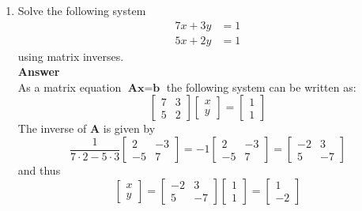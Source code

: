\documentclass[11pt]{article}
\newcommand{\tb}{\textbf}
\theoremstyle{definition}
\begin{document}
\begin{enumerate}
\begin{enumerate}
		\item Prove that
		\begin{equation*}
			\tb{A}^\ast \tb{A}
		\end{equation*}
		is self-adjoint
            \\
            \textbf{Answer}
            \\
            \begin{align*}
            (\tb{A}^\ast \tb{A})^\ast =\tb{A}^\ast(\tb{A}^\ast)^\ast =\tb{A}^\ast\tb{A}
            \end{align*}

	\end{enumerate}
	
	\item Solve the following system
	\begin{align*}
		7 x + 3y & = 1 \\
		5 x + 2y & = 1
	\end{align*}
	using matrix inverses.
        \\
        \textbf{Answer}
        \\
        As a matrix equation $\tb{A} \tb{x} = \tb{b}$ the following system can be written as:
	\begin{equation*}
		\begin{bmatrix} 7 & 3 \\ 5 & 2 \end{bmatrix} \begin{bmatrix} x \\ y \end{bmatrix} = \begin{bmatrix} 1 \\ 1 \end{bmatrix}
	\end{equation*}
        The inverse of $\tb{A}$ is given by
	\begin{equation*}
		\frac{1}{7\cdot2 - 5\cdot3} \begin{bmatrix} 2 & -3 \\ -5 & 7 \end{bmatrix} = -1\begin{bmatrix} 2 & -3 \\ -5 & 7 \end{bmatrix} = \begin{bmatrix} -2 & 3 \\ 5 & -7 \end{bmatrix}
	\end{equation*}
	and thus
	\begin{equation*}
		\begin{bmatrix} x \\ y \end{bmatrix} = \begin{bmatrix} -2 & 3 \\ 5 & -7 \end{bmatrix}  \begin{bmatrix} 1 \\ 1 \end{bmatrix} = \begin{bmatrix} 1 \\ -2 \end{bmatrix}
	\end{equation*}
	

\end{enumerate}
\end{document}
